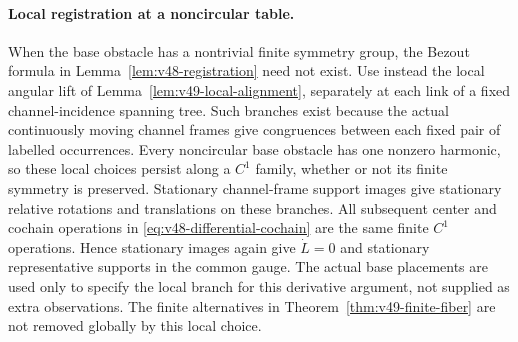 \paragraph{Local registration at a noncircular table.}
When the base obstacle has a nontrivial finite symmetry group, the
Bezout formula in Lemma~\ref{lem:v48-registration} need not exist.
Use instead the local angular lift of
Lemma~\ref{lem:v49-local-alignment}, separately at each link of a fixed
channel-incidence spanning tree.  Such branches exist because the actual
continuously moving channel frames give congruences between each fixed
pair of labelled occurrences.  Every noncircular base obstacle has
one nonzero harmonic, so these local choices persist along a
$C^1$ family, whether or not its finite symmetry is preserved.
Stationary channel-frame support images give stationary relative
rotations and translations on these branches.  All subsequent center
and cochain operations in \eqref{eq:v48-differential-cochain} are the
same finite $C^1$ operations.  Hence stationary images again give
$\dot L=0$ and stationary representative supports in the common gauge.
The actual base placements are used only to specify the local branch
for this derivative argument, not supplied as extra observations.
The finite alternatives in Theorem~\ref{thm:v49-finite-fiber} are not
removed globally by this local choice.

